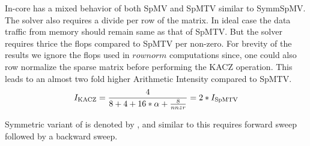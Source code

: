 In-core has a mixed behavior of both SpMV and SpMTV similar to SymmSpMV. The solver also requires a divide per  row of the matrix. In ideal case the data traffic from memory should remain same as that of SpMTV. But the solver requires thrice the flops compared to SpMTV per non-zero. For brevity of the results we ignore the flops used in $rownorm$ computations since, one could also row normalize the sparse matrix before performing the KACZ operation. This leads to an almost two fold higher Arithmetic Intensity compared to SpMTV.
\begin{equation}
\label{eq:KACZ_intensity}
I_\mathrm{KACZ} =  \frac{4}{8+4+16*\alpha+\frac{8}{nnzr}} = 2*I_\mathrm{SpMTV}\\
\end{equation}

Symmetric variant of \KACZ is denoted by \SYMMKACZ, and similar to \SYMMGS this requires forward sweep followed by a backward sweep. 